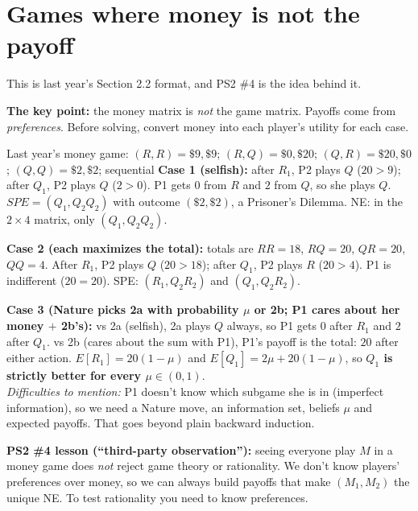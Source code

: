 \documentclass[11pt]{article}
\begin{document}
\section{Games where money is not the payoff}
This is last year's Section 2.2 format, and PS2 \#4 is the idea behind it.

\textbf{The key point:} the money matrix is \emph{not} the game matrix. Payoffs come from \emph{preferences}. Before solving, convert money into each player's utility for each case.

\begin{workbox}{Last year's money game: $(R,R)=\$9,\$9$; $(R,Q)=\$0,\$20$; $(Q,R)=\$20,\$0$; $(Q,Q)=\$2,\$2$; sequential}
\textbf{Case 1 (selfish):} after $R_1$, P2 plays $Q$ ($20>9$); after $Q_1$, P2 plays $Q$ ($2>0$). P1 gets $0$ from $R$ and $2$ from $Q$, so she plays $Q$. $SPE=(Q_1,Q_2Q_2)$ with outcome $(\$2,\$2)$, a Prisoner's Dilemma. NE: in the $2\times4$ matrix, only $(Q_1,Q_2Q_2)$.

\textbf{Case 2 (each maximizes the total):} totals are $RR=18$, $RQ=20$, $QR=20$, $QQ=4$. After $R_1$, P2 plays $Q$ ($20>18$); after $Q_1$, P2 plays $R$ ($20>4$). P1 is indifferent ($20=20$). SPE: $(R_1,Q_2R_2)$ and $(Q_1,Q_2R_2)$.

\textbf{Case 3 (Nature picks 2a with probability $\mu$ or 2b; P1 cares about her money $+$ 2b's):} vs 2a (selfish), 2a plays $Q$ always, so P1 gets $0$ after $R_1$ and $2$ after $Q_1$. vs 2b (cares about the sum with P1), P1's payoff is the total: $20$ after either action. $E[R_1]=20(1-\mu)$ and $E[Q_1]=2\mu+20(1-\mu)$, so \textbf{$Q_1$ is strictly better for every $\mu\in(0,1)$}.\\
\emph{Difficulties to mention:} P1 doesn't know which subgame she is in (imperfect information), so we need a Nature move, an information set, beliefs $\mu$ and expected payoffs. That goes beyond plain backward induction.
\end{workbox}

\textbf{PS2 \#4 lesson (``third-party observation''):} seeing everyone play $M$ in a money game does \emph{not} reject game theory or rationality. We don't know players' preferences over money, so we can always build payoffs that make $(M_1,M_2)$ the unique NE. To test rationality you need to know preferences.
\end{document}
